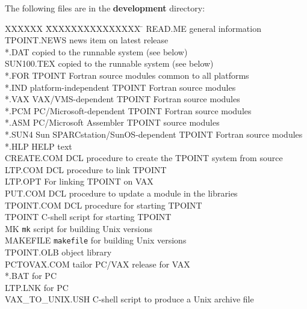 \goodbreak
The following files are in the {\bf development} directory:
\begin{tabs}
XXXXXX \= XXXXXXXXXXXXXXX \= \kill
\> READ.ME \> general information \\
\> TPOINT.NEWS \> news item on latest release \\
\> *.DAT \> copied to the runnable system (see below) \\
\> SUN100.TEX \> copied to the runnable system (see below) \\
\> *.FOR \> TPOINT Fortran source modules common to all platforms \\
\> *.IND \> platform-independent TPOINT Fortran source modules \\
\> *.VAX \> VAX/VMS-dependent TPOINT Fortran source modules \\
\> *.PCM \> PC/Microsoft-dependent TPOINT Fortran source modules \\
\> *.ASM \> PC/Microsoft Assembler TPOINT source modules \\
\> *.SUN4 \> Sun SPARCstation/SunOS-dependent TPOINT Fortran source modules \\
\> *.HLP \> HELP text \\
\> CREATE.COM \> DCL procedure to create the TPOINT system from source \\
\> LTP.COM \> DCL procedure to link TPOINT \\
\> LTP.OPT \> For linking TPOINT on VAX \\
\> PUT.COM \> DCL procedure to update a module in the libraries \\
\> TPOINT.COM \> DCL procedure for starting TPOINT \\
\> TPOINT \> C-shell script for starting TPOINT \\
\> MK \> \verb|mk| script for building Unix versions \\
\> MAKEFILE \> \verb|makefile| for building Unix versions \\
\> TPOINT.OLB \> object library \\
\> PCTOVAX.COM \> tailor PC/VAX release for VAX \\
\> *.BAT \> for PC \\
\> LTP.LNK \> for PC \\
\> VAX\_TO\_UNIX.USH \> C-shell script to produce a Unix archive file
\end{tabs}


